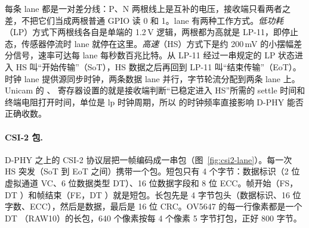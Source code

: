 每条 lane 都是一对差分线：P、N 两根线上是互补的电压，接收端只看两者之差，不把它们当成两根普通 GPIO 读 0 和 1。lane 有两种工作方式。\emph{低功耗}（LP）方式下两根线各自是单端的 1.2\,V 逻辑，两根都为高就是 LP-11，即停止态，传感器停流时 lane 就停在这里。\emph{高速}（HS）方式下是约 200\,mV 的小摆幅差分信号，速率可达每 lane 每秒数百兆比特。从 LP-11 经过一串规定的 LP 状态进入 HS 叫“开始传输”（SoT），HS 数据之后再回到 LP-11 叫“结束传输”（EoT）。时钟 lane 提供源同步时钟，两条数据 lane 并行，字节轮流分配到两条 lane 上。Unicam 的 、 寄存器设置的就是接收端判断“已稳定进入 HS”所需的 settle 时间和终端电阻打开时间，单位是 lp 时钟周期，所以  的时钟频率直接影响 D-PHY 能否正确收数。

\paragraph{CSI-2 包.} D-PHY 之上的 CSI-2 协议层把一帧编码成一串包（图~\ref{fig:csi2-lane}）。每一次 HS 突发（SoT 到 EoT 之间）携带一个包。短包只有 4 个字节：数据标识（2 位虚拟通道 VC、6 位数据类型 DT）、16 位数据字段和 8 位 ECC。帧开始（FS，DT ）和帧结束（FE，DT ）就是短包。长包先是 4 字节包头（数据标识、16 位字数、ECC），然后是数据，最后是 16 位 CRC。OV5647 的每一行像素都是一个 DT （RAW10）的长包，640 个像素按每 4 个像素 5 字节打包，正好 800 字节。

